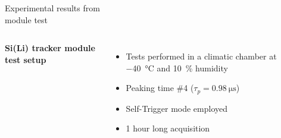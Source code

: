 \documentclass[aspectratio=169,xcolor=dvipsnames]{beamer}
\begin{document}
\begin{frame}{Experimental results from\\ \vskip-0.15cm module test}
    \addtolength{\leftmargini}{\labelsep}

    \begin{columns}

            \fontsize{10pt}{1}\selectfont
            \vskip0.1cm
            \textbf{Si(Li) tracker module test setup} \\
            \vspace{0.05cm}
            
            \fontsize{8.5pt}{1}\selectfont
            \begin{itemize}
                \item Tests performed in a climatic chamber at \SI{-40}{\celsius} and \SI{10}{\percent} humidity
                \item Peaking time \#4 ($\tau_{p} = \SI{0.98}{\micro\second}$)
                \item Self-Trigger mode employed
                \item 1 hour long acquisition
            \end{itemize}
            

\end{columns}
\end{frame}
\end{document}

